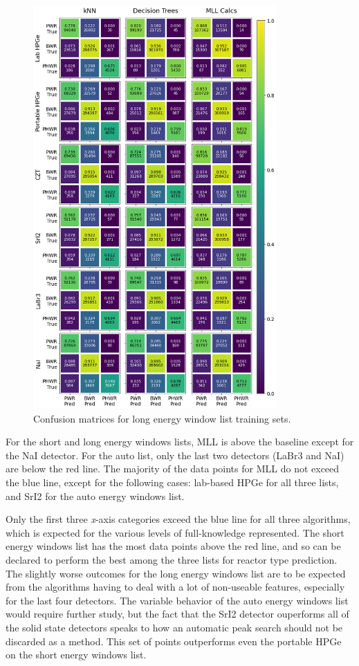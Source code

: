 \begin{figure}[H]
  \centering
  \includegraphics[width=0.83\textwidth]{./chapters/exp2/confusion_matrix_6dets_long.png}
  \caption{Confusion matrices for long energy window list training sets.}
  \label{fig:cm_long}
\end{figure}

For the short and long energy windows lists, \gls{MLL} is above the baseline
except for the \gls{NaI} detector.  For the auto list, only the last two
detectors (\gls{LaBr3} and \gls{NaI}) are below the red line.  The majority of
the data points for \gls{MLL} do not exceed the blue line, except for the
following cases: lab-based \gls{HPGe} for all three lists, and \gls{SrI2} for
the auto energy windows list.

Only the first three \textit{x}-axis categories exceed the blue line for all
three algorithms, which is expected for the various levels of full-knowledge
represented. The short energy windows list has the most data points above the
red line, and so can be declared to perform the best among the three lists for
reactor type prediction.  The slightly worse outcomes for the long energy
windows list are to be expected from the algorithms having to deal with a lot
of non-useable features,  especially for the
last four detectors.  The variable behavior of the auto energy windows list
would require further study, but the fact that the \gls{SrI2} detector
ouperforms all of the solid state detectors speaks to how an automatic peak
search should not be discarded as a method. This set of points outperforms even
the portable \gls{HPGe} on the short energy windows list.

